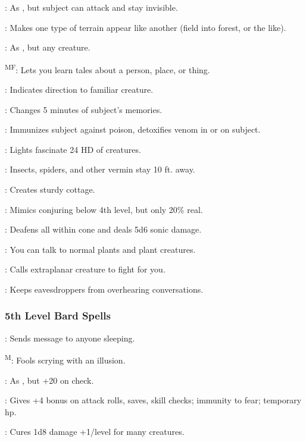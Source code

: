 : As , but subject can attack and stay invisible.

: Makes one type of terrain appear like another (field into forest, or the like).

: As , but any creature.

\textsuperscript{M}\textsuperscript{F}: Lets you learn tales about a person, place, or thing.

: Indicates direction to familiar creature.

: Changes 5 minutes of subject's memories.

: Immunizes subject against poison, detoxifies venom in or on subject.

: Lights fascinate 24 HD of creatures.

: Insects, spiders, and other vermin stay 10 ft. away.

: Creates sturdy cottage.

: Mimics conjuring below 4th level, but only 20\% real.

: Deafens all within cone and deals 5d6 sonic damage.

: You can talk to normal plants and plant creatures.

: Calls extraplanar creature to fight for you.

: Keeps eavesdroppers from overhearing conversations.

\subsubsection{5th Level Bard Spells}

: Sends message to anyone sleeping.

\textsuperscript{M}: Fools scrying with an illusion.

: As , but +20 on check.

: Gives +4 bonus on attack rolls, saves, skill checks; immunity to fear; temporary hp.

: Cures 1d8 damage +1/level for many creatures.

